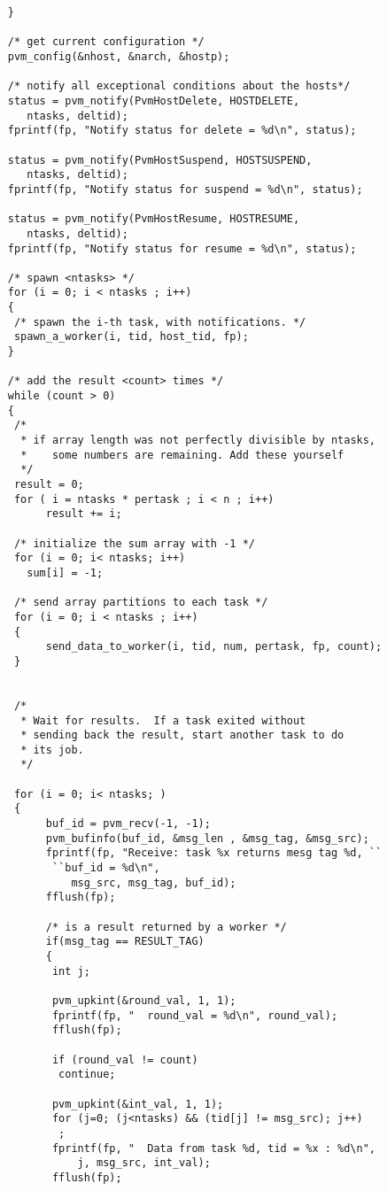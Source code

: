 \begin{small}
\begin{verbatim}
     }

     /* get current configuration */
     pvm_config(&nhost, &narch, &hostp);

     /* notify all exceptional conditions about the hosts*/
     status = pvm_notify(PvmHostDelete, HOSTDELETE, 
		ntasks, deltid);
     fprintf(fp, "Notify status for delete = %d\n", status);
     
     status = pvm_notify(PvmHostSuspend, HOSTSUSPEND, 
		ntasks, deltid);
     fprintf(fp, "Notify status for suspend = %d\n", status);
     
     status = pvm_notify(PvmHostResume, HOSTRESUME, 
		ntasks, deltid);
     fprintf(fp, "Notify status for resume = %d\n", status);

     /* spawn <ntasks> */
     for (i = 0; i < ntasks ; i++) 
     {
	  /* spawn the i-th task, with notifications. */
	  spawn_a_worker(i, tid, host_tid, fp);
     }

     /* add the result <count> times */
     while (count > 0) 
     {
	  /* 
	   * if array length was not perfectly divisible by ntasks, 
	   *	some numbers are remaining. Add these yourself 
	   */
	  result = 0;
	  for ( i = ntasks * pertask ; i < n ; i++)
	       result += i;
	 
	  /* initialize the sum array with -1 */
	  for (i = 0; i< ntasks; i++) 
	    sum[i] = -1;
 
	  /* send array partitions to each task */
	  for (i = 0; i < ntasks ; i++) 
	  {
	       send_data_to_worker(i, tid, num, pertask, fp, count);
	  }

	  
	  /* 
	   * Wait for results.  If a task exited without 
	   * sending back the result, start another task to do
	   * its job. 
	   */
	  
	  for (i = 0; i< ntasks; )
	  {	  
	       buf_id = pvm_recv(-1, -1);
	       pvm_bufinfo(buf_id, &msg_len , &msg_tag, &msg_src);
	       fprintf(fp, "Receive: task %x returns mesg tag %d, ``
			``buf_id = %d\n", 
		       msg_src, msg_tag, buf_id);
	       fflush(fp);
	       
	       /* is a result returned by a worker */
	       if(msg_tag == RESULT_TAG)  
	       {
		    int j;
		    
		    pvm_upkint(&round_val, 1, 1);
		    fprintf(fp, "  round_val = %d\n", round_val);
		    fflush(fp);
		 
		    if (round_val != count)
			 continue;

		    pvm_upkint(&int_val, 1, 1);
		    for (j=0; (j<ntasks) && (tid[j] != msg_src); j++)
			 ;
		    fprintf(fp, "  Data from task %d, tid = %x : %d\n", 
			    j, msg_src, int_val);
		    fflush(fp);
		    

\end{verbatim}
\end{small}

